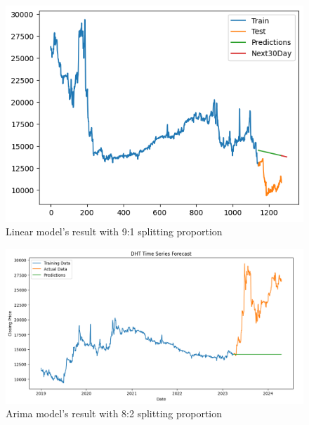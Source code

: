 \documentclass{ieeeojies}
\begin{document}
\begin{figure}[H]
  \centering
  \begin{minipage}{0.8\linewidth}
    \centering
    \includegraphics[width=\linewidth]{bibliography/Figure/LN_DHT91.png}
    \caption{Linear model's result with 9:1 splitting proportion}
    \label{fig8}
  \end{minipage}
\end{figure}


\begin{figure}[H]
  \centering
  \begin{minipage}{0.8\linewidth}
    \centering
    \includegraphics[width=\linewidth]{bibliography/Figure/DHT_ARIMA.png}
    \caption{Arima model's result with 8:2 splitting proportion}
    \label{fig8}
  \end{minipage}
\end{figure}
\end{document}
